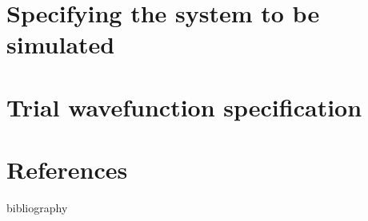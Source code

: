 \documentclass[11pt,usletter]{report}
\begin{document}

\newpage
\tableofcontents
\newpage

\begin{btUnit}










\chapter{Specifying the system to be simulated}



\chapter{Trial wavefunction specification}










































\chapter*{References}
\begin{btSect}{bibliography}
\btPrintCited
\end{btSect}
\end{btUnit}

\appendix

\begin{btUnit}

\end{btUnit}
\end{document}
